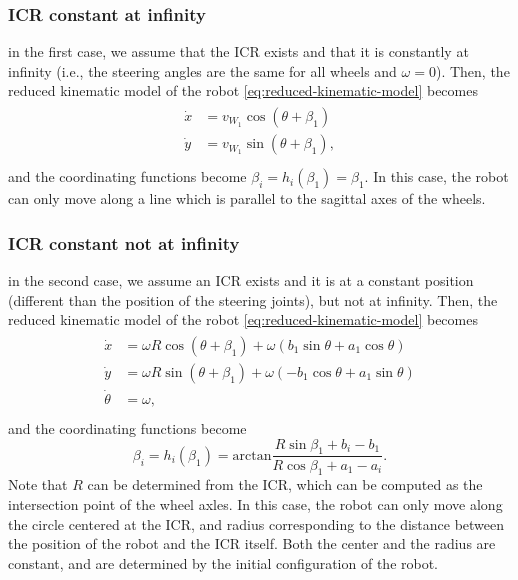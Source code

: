 \subsubsection{ICR constant at infinity}
\label{sec:icr-constant-at-infinity}
in the first case, we assume that the ICR exists and that it is constantly at infinity (i.e., the steering angles are the same for all wheels and $\omega = 0$). Then, the reduced kinematic model of the robot \eqref{eq:reduced-kinematic-model} becomes
\begin{align}
\label{eq:icr-constant-at-infinity-kinematic-model}
\begin{split}
    \dot{x} &= v_{W_1} \cos(\theta + \beta_1) \\
    \dot{y} &= v_{W_1} \sin(\theta + \beta_1), \\
\end{split}
\end{align}
and the coordinating functions become $\beta_i = h_i(\beta_1) = \beta_1$. In this case, the robot can only move along a line which is parallel to the sagittal axes of the wheels.

\subsubsection{ICR constant not at infinity}
\label{sec:icr-constant-not-at-infinity}
in the second case, we assume an ICR exists and it is at a constant position (different than the position of the steering joints), but not at infinity. Then, the reduced kinematic model of the robot \eqref{eq:reduced-kinematic-model} becomes
\begin{align}
\label{eq:icr-constant-not-at-infinity-kinematic-model}
\begin{split}
    \dot{x} &= \omega R \cos(\theta + \beta_1) + \omega (b_1 \sin\theta + a_1 \cos\theta) \\
    \dot{y} &= \omega R \sin(\theta + \beta_1) + \omega (-b_1 \cos\theta + a_1 \sin\theta) \\
    \dot{\theta} &= \omega, \\
\end{split}
\end{align}
and the coordinating functions become
\begin{equation*}
    \beta_i = h_i(\beta_1) = \mathrm{arctan}\frac{R \sin\beta_1 + b_i - b_1}{R \cos\beta_1 + a_1 - a_i}.
\end{equation*}
Note that $R$ can be determined from the ICR, which can be computed as the intersection point of the wheel axles. In this case, the robot can only move along the circle centered at the ICR, and radius corresponding to the distance between the position of the robot and the ICR itself. Both the center and the radius are constant, and are determined by the initial configuration of the robot.

